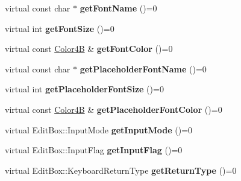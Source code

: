 \begin{DoxyCompactItemize}
\mbox{\label{classcocos2d_1_1ui_1_1EditBoxImpl_a459b130dd935cf5969c77aa54a056857}} 
virtual const char $\ast$ {\bfseries get\+Font\+Name} ()=0
\item 
\mbox{\label{classcocos2d_1_1ui_1_1EditBoxImpl_a0061d89ab0b826e07fbd61d264bc9f87}} 
virtual int {\bfseries get\+Font\+Size} ()=0
\item 
\mbox{\label{classcocos2d_1_1ui_1_1EditBoxImpl_ab04981de763ff171d211c266713b4bad}} 
virtual const \hyperlink{structColor4B}{Color4B} \& {\bfseries get\+Font\+Color} ()=0
\item 
\mbox{\label{classcocos2d_1_1ui_1_1EditBoxImpl_a25c7ee42e215403e2d0b279cb35d88da}} 
virtual const char $\ast$ {\bfseries get\+Placeholder\+Font\+Name} ()=0
\item 
\mbox{\label{classcocos2d_1_1ui_1_1EditBoxImpl_a399cf7df5182e1d57d5dede369ea6dfd}} 
virtual int {\bfseries get\+Placeholder\+Font\+Size} ()=0
\item 
\mbox{\label{classcocos2d_1_1ui_1_1EditBoxImpl_a119ab66ef79886cf08b231896f26936c}} 
virtual const \hyperlink{structColor4B}{Color4B} \& {\bfseries get\+Placeholder\+Font\+Color} ()=0
\item 
\mbox{\label{classcocos2d_1_1ui_1_1EditBoxImpl_a6928ac978de38fe0a403be44af507052}} 
virtual Edit\+Box\+::\+Input\+Mode {\bfseries get\+Input\+Mode} ()=0
\item 
\mbox{\label{classcocos2d_1_1ui_1_1EditBoxImpl_a466d5b3b6e6e28a1f9e25e5d4d1f17e4}} 
virtual Edit\+Box\+::\+Input\+Flag {\bfseries get\+Input\+Flag} ()=0
\item 
\mbox{\label{classcocos2d_1_1ui_1_1EditBoxImpl_a1aafe3288ee427236364c210a2ca4957}} 
virtual Edit\+Box\+::\+Keyboard\+Return\+Type {\bfseries get\+Return\+Type} ()=0
\item 
\mbox{\label{classcocos2d_1_1ui_1_1EditBoxImpl_a36f5edaca508e550eab079dce65f5f9e}} 

\end{DoxyCompactItemize}
